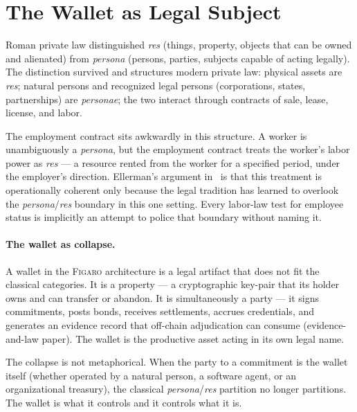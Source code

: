 \documentclass[11pt,a4paper]{article}
\theoremstyle{remark}
\newcommand{\figaro}{\textsc{Figaro}}
\begin{document}
\section{The Wallet as Legal Subject}
\label{sec:wallet}

Roman private law distinguished \emph{res} (things, property,
objects that can be owned and alienated) from \emph{persona}
(persons, parties, subjects capable of acting legally). The
distinction survived and structures modern private law: physical
assets are \emph{res}; natural persons and recognized legal
persons (corporations, states, partnerships) are \emph{personae};
the two interact through contracts of sale, lease, license, and
labor.

The employment contract sits awkwardly in this structure. A worker
is unambiguously a \emph{persona}, but the employment contract
treats the worker's labor power as \emph{res} --- a resource
rented from the worker for a specified period, under the
employer's direction. Ellerman's argument
in~ is that this treatment is operationally
coherent only because the legal tradition has learned to overlook
the \emph{persona}/\emph{res} boundary in this one setting. Every
labor-law test for employee status is implicitly an attempt to
police that boundary without naming it.

\paragraph{The wallet as collapse.}
A wallet in the \figaro{} architecture is a legal artifact that
does not fit the classical categories. It is a property --- a
cryptographic key-pair that its holder owns and can transfer or
abandon. It is simultaneously a party --- it signs commitments,
posts bonds, receives settlements, accrues credentials, and
generates an evidence record that off-chain adjudication can
consume (evidence-and-law paper). The wallet is the productive
asset acting in its own legal name.

The collapse is not metaphorical. When the party to a commitment
is the wallet itself (whether operated by a natural person, a
software agent, or an organizational treasury), the classical
\emph{persona}/\emph{res} partition no longer partitions. The
wallet is what it controls and it controls what it is.
\end{document}
